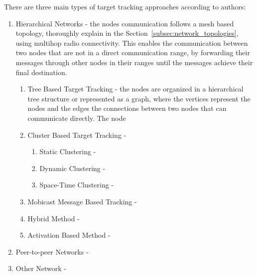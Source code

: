 There are three main types of target tracking approaches according to \cite{Ramya2012} authors:
\begin{enumerate}
      \item Hierarchical Networks - the nodes communication follows a mesh based topology,
            thoroughly explain in the Section~\ref{subsec:network_topologies}, using multihop
            radio connectivity. This enables the communication between two nodes that are not
            in a direct communication range, by forwarding their messages through other nodes in
            their ranges until the messages achieve their final destination.
            \begin{enumerate}
                  \item Tree Based Target Tracking - the nodes are organized in a hierarchical
                        tree structure or represented as a graph, where the vertices represent the
                        nodes and the edges the connections between two nodes that can communicate
                        directly. The node
                  \item Cluster Based Target Tracking -
                        \begin{enumerate}
                              \item Static Clustering -
                              \item Dynamic Clustering -
                              \item Space-Time Clustering -
                        \end{enumerate}
                  \item Mobicast Message Based Tracking -
                  \item Hybrid Method -
                  \item Activation Based Method -
            \end{enumerate}
      \item Peer-to-peer Networks -
      \item Other Network -
\end{enumerate}





